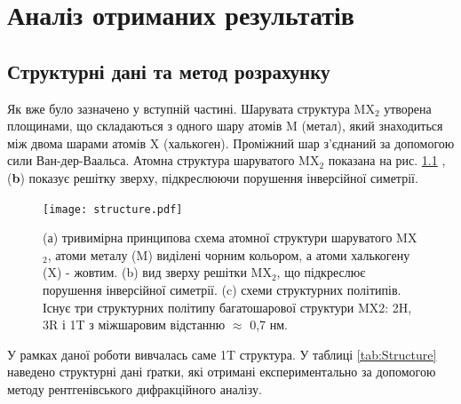\chapter{Аналіз отриманих результатів}
\section{Структурні дані та метод розрахунку}
Як вже було зазначено у вступній частині. Шарувата структура MX$_2$ утворена площинами, що складаються з одного шару атомів M (метал), який знаходиться між двома шарами атомів X (халькоген). Проміжний шар з'єднаний за допомогою сили Ван-дер-Ваальса. Атомна структура шаруватого MX$_2$ показана на рис. \ref{structure} \cite{FU2016221}, (\textbf{b}) показує решітку зверху, підкреслюючи порушення інверсійної симетрії. 

\begin{figure}
	\centering
	\texttt{[image: structure.pdf]}
	\caption{(а) тривимірна принципова схема атомної структури шаруватого MX$_2$, атоми металу (M) виділені чорним кольором, а атоми халькогену (X) - жовтим. (b) вид зверху решітки MX$_2$, що підкреслює порушення інверсійної симетрії. (c) схеми структурних політипів. Існує три структурних політипу багатошарової структури MX2: 2H, 3R і 1T з міжшаровим відстанню $\approx$ 0,7 нм.}
	\label{structure}
\end{figure}

У рамках даної роботи вивчалась саме 1T структура. У таблиці \ref{tab:Structure} наведено структурні дані ґратки, які отримані експериментально за допомогою методу рентгенівського дифракційного аналізу.

